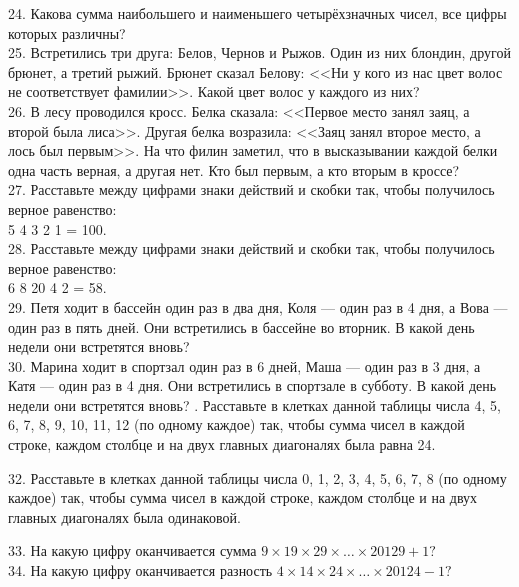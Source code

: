 24. Какова сумма наибольшего и наименьшего четырёхзначных чисел, все цифры которых различны?\\
25. Встретились три друга: Белов, Чернов и Рыжов. Один из них блондин, другой брюнет, а третий рыжий. Брюнет сказал Белову: <<Ни у кого из нас цвет волос не соответствует фамилии>>. Какой цвет волос у каждого из них?\\
26. В лесу проводился кросс. Белка сказала: <<Первое место занял заяц, а второй была лиса>>. Другая белка возразила: <<Заяц занял второе место, а лось был первым>>. На что филин заметил, что в высказывании каждой белки одна часть верная, а другая нет. Кто был первым, а кто вторым в кроссе?\\
27. Расставьте между цифрами знаки действий и скобки так, чтобы получилось верное равенство:\\ 5 4 3 2 1 = 100.\\
28. Расставьте между цифрами знаки действий и скобки так, чтобы получилось верное равенство:\\ 6 8 20 4 2 = 58.\\
29. Петя ходит в бассейн один раз в два дня, Коля --- один раз в 4 дня, а Вова --- один раз в пять дней. Они встретились в бассейне во вторник. В какой день недели они встретятся вновь?\\
30. Марина ходит в спортзал один раз в 6 дней, Маша --- один раз в 3 дня, а Катя --- один раз в 4 дня. Они встретились в спортзале в субботу. В какой день недели они встретятся вновь?
\newpage
{}. Расставьте в клетках данной таблицы числа 4, 5, 6, 7, 8, 9, 10, 11, 12 (по одному каждое) так, чтобы сумма чисел в каждой строке, каждом столбце и на двух главных диагоналях была равна 24.
\begin{center}
\begin{figure}[ht!]
\end{figure}
\end{center}
32. Расставьте в клетках данной таблицы числа 0, 1, 2, 3, 4, 5, 6, 7, 8 (по одному каждое) так, чтобы сумма чисел в каждой строке, каждом столбце и на двух главных диагоналях была одинаковой.
\begin{center}
\begin{figure}[ht!]
\end{figure}
\end{center}
33. На какую цифру оканчивается сумма $9\times19\times29\times\ldots\times20129+1?$\\
34. На какую цифру оканчивается разность $4\times14\times24\times\ldots\times20124-1?$\\
